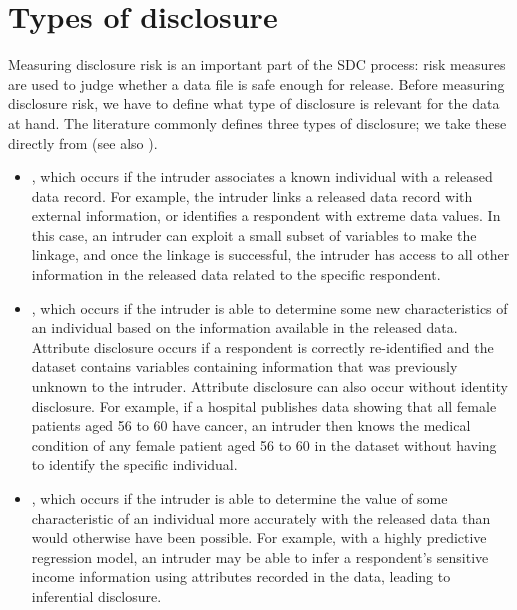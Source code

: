 \documentclass[letterpaper,10pt,english]{sphinxmanual}
\begin{document}
\section{Types of disclosure}
\label{\detokenize{measure_risk:types-of-disclosure}}
Measuring disclosure risk is an important part of the SDC process: risk
measures are used to judge whether a data file is safe enough for
release. Before measuring disclosure risk, we have to define what type
of disclosure is relevant for the data at hand. The literature commonly
defines three types of disclosure; we take these directly from {\hyperref[\detokenize{measure_risk:lamb93}]{}}
(see also {\hyperref[\detokenize{measure_risk:hdfg12}]{}}).
\begin{itemize}
\item {} 
, which occurs if the intruder associates a
known individual with a released data record. For example, the
intruder links a released data record with external information, or
identifies a respondent with extreme data values. In this case, an
intruder can exploit a small subset of variables to make the linkage,
and once the linkage is successful, the intruder has access to all
other information in the released data related to the specific
respondent.

\item {} 
, which occurs if the intruder is able to
determine some new characteristics of an individual based on the
information available in the released data. Attribute disclosure
occurs if a respondent is correctly re-identified and the dataset
contains variables containing information that was previously unknown
to the intruder. Attribute disclosure can also occur without identity
disclosure. For example, if a hospital publishes data showing that
all female patients aged 56 to 60 have cancer, an intruder then knows
the medical condition of any female patient aged 56 to 60 in the
dataset without having to identify the specific individual.

\item {} 
, which occurs if the intruder is able to
determine the value of some characteristic of an individual more
accurately with the released data than would otherwise have been
possible. For example, with a highly predictive regression model, an
intruder may be able to infer a respondent’s sensitive income
information using attributes recorded in the data, leading to
inferential disclosure.

\end{itemize}
\end{document}
